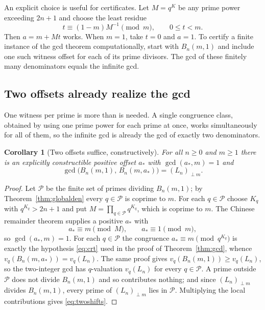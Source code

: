 \documentclass[11pt,a4paper]{article}
\numberwithin{equation}{section}
\newtheorem{corollary}[theorem]{Corollary}
\theoremstyle{definition}
\theoremstyle{remark}
\begin{document}
An explicit choice is useful for certificates. Let $M=q^K$ be any prime power exceeding $2n+1$ and choose the least residue
\[
 t\equiv (1-m)M^{-1}\pmod m,\qquad 0\leq t<m.
\]
Then $a=m+Mt$ works. When $m=1$, take $t=0$ and $a=1$. To certify a finite instance of the gcd theorem computationally, start with $B_n(m,1)$ and include one such witness offset for each of its prime divisors. The gcd of these finitely many denominators equals the infinite gcd.

\subsection{Two offsets already realize the gcd}\label{sec:twoshifts}
One witness per prime is more than is needed. A single congruence class, obtained by using one prime power for each prime at once, works simultaneously for all of them, so the infinite gcd is already the gcd of exactly two denominators.

\begin{corollary}[Two offsets suffice, constructively]\label{cor:twoshifts}
For all $n\geq0$ and $m\geq1$ there is an explicitly constructible positive offset $a_*$ with $\gcd(a_*,m)=1$ and
\begin{equation}\label{eq:twoshifts}
 \gcd\bigl(B_n(m,1),\,B_n(m,a_*)\bigr)=(L_n)_{\perp m}.
\end{equation}
\end{corollary}
\begin{proof}
Let $\mathcal P$ be the finite set of primes dividing $B_n(m,1)$; by Theorem~\ref{thm:globalden} every $q\in\mathcal P$ is coprime to $m$. For each $q\in\mathcal P$ choose $K_q$ with $q^{K_q}>2n+1$ and put $M=\prod_{q\in\mathcal P}q^{K_q}$, which is coprime to $m$. The Chinese remainder theorem supplies a positive $a_*$ with
\[
 a_*\equiv m\pmod M,\qquad a_*\equiv1\pmod m,
\]
so $\gcd(a_*,m)=1$. For each $q\in\mathcal P$ the congruence $a_*\equiv m\pmod{q^{K_q}}$ is exactly the hypothesis \eqref{eq:crt} used in the proof of Theorem~\ref{thm:gcd}, whence $v_q(B_n(m,a_*))=v_q(L_n)$. The same proof gives $v_q(B_n(m,1))\geq v_q(L_n)$, so the two-integer gcd has $q$-valuation $v_q(L_n)$ for every $q\in\mathcal P$. A prime outside $\mathcal P$ does not divide $B_n(m,1)$ and so contributes nothing; and since $(L_n)_{\perp m}$ divides $B_n(m,1)$, every prime of $(L_n)_{\perp m}$ lies in $\mathcal P$. Multiplying the local contributions gives \eqref{eq:twoshifts}.
\end{proof}
\end{document}
